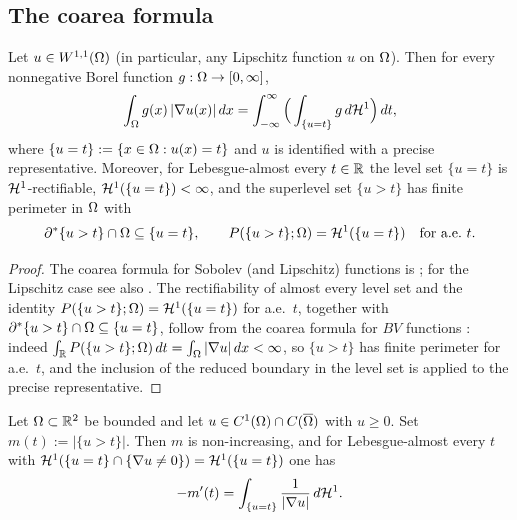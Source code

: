 \subsection{The coarea formula}\label{ss:coarea}

\begin{theorem}\label{thm:coarea}
Let $u\in W^{1,1}(\Omega)$ (in particular, any Lipschitz function $u$ on $\Omega$).
Then for every nonnegative Borel function $g:\Omega\to[0,\infty]$,
\[
  \int_\Omega g(x)\,|\nabla u(x)|\,dx
  =\int_{-\infty}^{\infty}\Big(\int_{\{u=t\}}g\,d\mathcal{H}^1\Big)\,dt,
\]
where $\{u=t\}:=\{x\in\Omega:u(x)=t\}$ and $u$ is identified with a precise
representative. Moreover, for Lebesgue-almost every $t\in\mathbb{R}$ the level set
$\{u=t\}$ is $\mathcal{H}^1$-rectifiable, $\mathcal{H}^1(\{u=t\})<\infty$, and the
superlevel set $\{u>t\}$ has finite perimeter in $\Omega$ with
\[
  \partial^*\{u>t\}\cap\Omega\subseteq\{u=t\},
  \qquad
  P(\{u>t\};\Omega)=\mathcal{H}^1(\{u=t\})\quad\text{for a.e.\ }t .
\]
\end{theorem}

\begin{proof}
The coarea formula for Sobolev (and Lipschitz) functions is
\cite[Theorem~13.1 and Remark~13.2]{Maggi2012}; for the Lipschitz case see
also \cite[Section~3.4.3, Theorem~3.13]{EvansGariepy2015}. The
rectifiability of almost every level set and the identity
$P(\{u>t\};\Omega)=\mathcal{H}^1(\{u=t\})$ for a.e.\ $t$, together with
$\partial^*\{u>t\}\cap\Omega\subseteq\{u=t\}$, follow from the coarea formula for
$BV$ functions \cite[Theorem~3.40]{AFP2000}: indeed
$\int_{\mathbb{R}} P(\{u>t\};\Omega)\,dt=\int_\Omega|\nabla u|\,dx<\infty$, so $\{u>t\}$ has
finite perimeter for a.e.\ $t$, and the inclusion of the reduced boundary in
the level set is \cite[Theorem~16.2]{Maggi2012} applied to the precise
representative.
\end{proof}

\begin{lemma}\label{lem:dist-fn}
Let $\Omega\subset\mathbb{R}^2$ be bounded and let $u\in C^1(\Omega)\cap C(\overline{\Omega})$
with $u\ge 0$. Set $m(t):=|\{u>t\}|$. Then $m$ is non-increasing, and for
Lebesgue-almost every $t$ with $\mathcal{H}^1(\{u=t\}\cap\{\nabla u\ne 0\})=\mathcal{H}^1(\{u=t\})$
one has
\[
  -m'(t)=\int_{\{u=t\}}\frac{1}{|\nabla u|}\,d\mathcal{H}^1 .
\]
\end{lemma}

